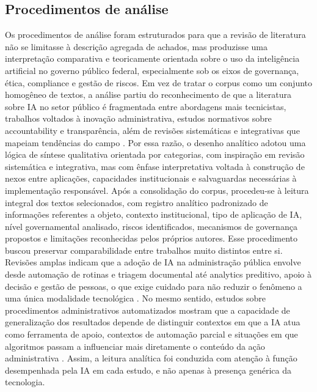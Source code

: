 \documentclass[12pt,a4paper]{article}
\begin{document}
\subsection{Procedimentos de análise}
\label{sec:orgdbed2a6}
Os procedimentos de análise foram estruturados para que a revisão de literatura não se limitasse à descrição agregada de achados, mas produzisse uma interpretação comparativa e teoricamente orientada sobre o uso da inteligência artificial no governo público federal, especialmente sob os eixos de governança, ética, compliance e gestão de riscos. Em vez de tratar o corpus como um conjunto homogêneo de textos, a análise partiu do reconhecimento de que a literatura sobre IA no setor público é fragmentada entre abordagens mais tecnicistas, trabalhos voltados à inovação administrativa, estudos normativos sobre accountability e transparência, além de revisões sistemáticas e integrativas que mapeiam tendências do campo \autocite{madan2022ai} \autocite{serra2024a} \autocite{criado2024artificial}. Por essa razão, o desenho analítico adotou uma lógica de síntese qualitativa orientada por categorias, com inspiração em revisão sistemática e integrativa, mas com ênfase interpretativa voltada à construção de nexos entre aplicações, capacidades institucionais e salvaguardas necessárias à implementação responsável.
Após a consolidação do corpus, procedeu-se à leitura integral dos textos selecionados, com registro analítico padronizado de informações referentes a objeto, contexto institucional, tipo de aplicação de IA, nível governamental analisado, riscos identificados, mecanismos de governança propostos e limitações reconhecidas pelos próprios autores. Esse procedimento buscou preservar comparabilidade entre trabalhos muito distintos entre si. Revisões amplas indicam que a adoção de IA na administração pública envolve desde automação de rotinas e triagem documental até analytics preditivo, apoio à decisão e gestão de pessoas, o que exige cuidado para não reduzir o fenômeno a uma única modalidade tecnológica \autocite{madan2022ai} \autocite{pi2021machine} \autocite{chilunjika2022artificial}. No mesmo sentido, estudos sobre procedimentos administrativos automatizados mostram que a capacidade de generalização dos resultados depende de distinguir contextos em que a IA atua como ferramenta de apoio, contextos de automação parcial e situações em que algoritmos passam a influenciar mais diretamente o conteúdo da ação administrativa \autocite{parycek2023artificial}. Assim, a leitura analítica foi conduzida com atenção à função desempenhada pela IA em cada estudo, e não apenas à presença genérica da tecnologia.
\end{document}
